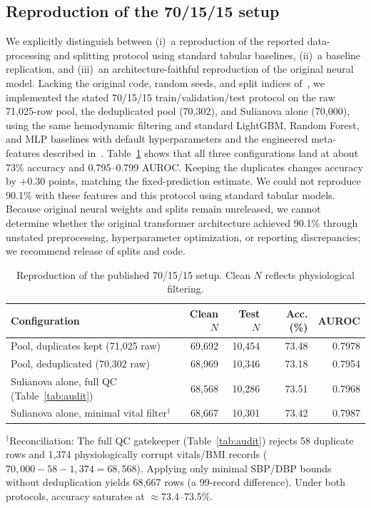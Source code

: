 \documentclass[journal]{IEEEtran}
\begin{document}
\subsection{Reproduction of the 70/15/15 setup}
We explicitly distinguish between (i)~a reproduction of the reported data-processing and splitting protocol using standard tabular baselines, (ii)~a baseline replication, and (iii)~an architecture-faithful reproduction of the original neural model. Lacking the original code, random seeds, and split indices of~\cite{mahmud2026}, we implemented the stated 70/15/15 train/validation/test protocol on the raw 71{,}025-row pool, the deduplicated pool (70{,}302), and Sulianova alone (70{,}000), using the same hemodynamic filtering and standard LightGBM, Random Forest, and MLP baselines with default hyperparameters and the engineered meta-features described in~\cite{mahmud2026}. Table~\ref{tab:repro} shows that all three configurations land at about 73\% accuracy and 0.795--0.799 AUROC. Keeping the duplicates changes accuracy by $+0.30$ points, matching the fixed-prediction estimate. We could not reproduce 90.1\% with these features and this protocol using standard tabular models. Because original neural weights and splits remain unreleased, we cannot determine whether the original transformer architecture achieved 90.1\% through unstated preprocessing, hyperparameter optimization, or reporting discrepancies; we recommend release of splits and code.

\begin{table}[t]
\caption{Reproduction of the published 70/15/15 setup. Clean $N$ reflects physiological filtering.}
\label{tab:repro}
\centering\footnotesize
\setlength{\tabcolsep}{3pt}
\begin{tabular}{p{3.1cm}rrrr}
\toprule
Configuration & Clean $N$ & Test $N$ & Acc. (\%) & AUROC\\
\midrule
Pool, duplicates kept (71{,}025 raw) & 69{,}692 & 10{,}454 & 73.48 & 0.7978\\
Pool, deduplicated (70{,}302 raw) & 68{,}969 & 10{,}346 & 73.18 & 0.7954\\
Sulianova alone, full QC (Table~\ref{tab:audit}) & 68{,}568 & 10{,}286 & 73.51 & 0.7968\\
Sulianova alone, minimal vital filter$^\dagger$ & 68{,}667 & 10{,}301 & 73.42 & 0.7987\\
\bottomrule
\end{tabular}
\vspace{1.5pt}
{\scriptsize $^\dagger$Reconciliation: The full QC gatekeeper (Table~\ref{tab:audit}) rejects 58 duplicate rows and 1{,}374 physiologically corrupt vitals/BMI records ($70{,}000 - 58 - 1{,}374 = 68{,}568$). Applying only minimal SBP/DBP bounds without deduplication yields 68{,}667 rows (a 99-record difference). Under both protocols, accuracy saturates at $\approx$73.4--73.5\%.\par}
\end{table}
\end{document}
